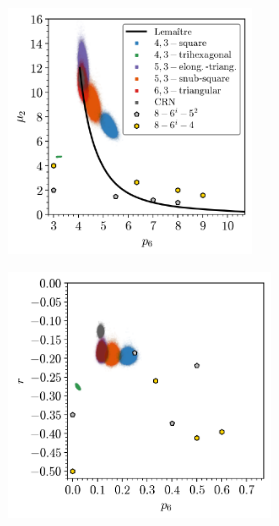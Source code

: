 \begin{figure}[bt]
     \centering
     
     \begin{subfigure}[b]{0.45\textwidth}
         \centering
         \includegraphics[height=6.5cm]{./figures/procrystals/pro3_p6_mu2.pdf}
         \caption{}
         \label{fig:pro3p6mu2}
     \end{subfigure}
     \hspace{1cm}
     \begin{subfigure}[b]{0.45\textwidth}
         \centering
         \includegraphics[height=6.5cm]{./figures/procrystals/pro3_p6_r.pdf}
         \caption{}
         \label{fig:pro3p6r}
     \end{subfigure}
     

\end{figure}
